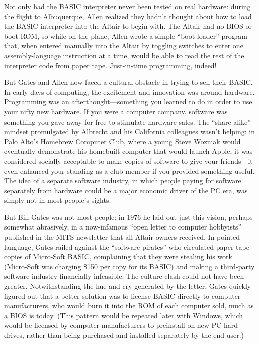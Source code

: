\begin{tangent}
Not only had the BASIC interpreter never been tested on real hardware:
during the flight to Albuquerque, Allen realized they hadn't thought
about how to load the BASIC interpreter into the Altair to begin with.
The Altair had no BIOS or boot ROM, so while on the plane, Allen wrote a
simple ``boot loader'' program that, when entered manually into the
Altair by toggling switches to enter one assembly-language instruction
at a time, would be able to read the rest of the interpreter code from
paper tape.  Just-in-time programming, indeed!
\end{tangent}

But Gates and Allen now faced a cultural obstacle in trying to sell
their BASIC.
In early days of computing, the excitement and innovation was around
hardware.
Programming was an afterthought---something you learned to do in order
to use your nifty new hardware.
If you were a computer company, software was something you gave away
for free to stimulate hardware sales.
The ``share-alike'' mindset promulgated by Albrecht and his California
colleagues wasn't helping: in Palo Alto's Homebrew Computer Club,
where a young Steve Wozniak would eventually demonstrate his homebuilt
computer that would launch Apple, it was considered socially
acceptable to make copies of software to give your friends---it even
enhanced your standing as a club member if you provided something
useful.
The idea of a separate software industry, in which people paying for
software separately from hardware could be a major economic driver of
the PC era, was simply not in most people's sights.
  
But Bill Gates was not most people: in 1976 he laid out just this
vision, perhaps somewhat abrasively, in a now-infamous ``open letter
to computer hobbyists'' published in the MITS newsletter that all
Altair owners received.
In pointed language, Gates railed against the ``software pirates'' who
circulated paper tape copies of Micro-Soft BASIC, complaining that
they were stealing his work (Micro-Soft was charging \$150 per copy
for its BASIC) and making a third-party software industry financially
infeasible.
The culture clash could not have been greater.
Notwithstanding the hue and cry generated by the letter, Gates quickly
figured out that a better solution was to license BASIC directly to
computer manufacturers, who would burn it into the ROM of each
computer sold, much as a BIOS is today.
(This pattern would be repeated later with Windows, which would be
licensed by computer manufacturers to preinstall on new PC hard
drives, rather than being purchased and installed separately by the
end user.)

